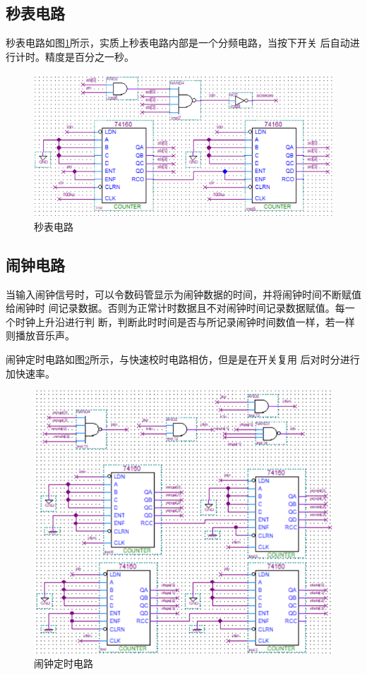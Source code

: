 \documentclass[twoside, openright]{article}
\begin{document}
\subsection{秒表电路}%
\label{sub:秒表电路}

秒表电路如图\ref{fig:秒表电路}所示，实质上秒表电路内部是一个分频电路，当按下开关
后自动进行计时。精度是百分之一秒。

\begin{figure}[htbp]
	\centering
	\includegraphics[width = 0.7\linewidth]{timer.png}
	\caption{秒表电路}
	\label{fig:秒表电路}
\end{figure}

\subsection{闹钟电路}%
\label{sub:闹钟电路}

当输入闹钟信号时，可以令数码管显示为闹钟数据的时间，并将闹钟时间不断赋值给闹钟时
间记录数据。否则为正常计时数据且不对闹钟时间记录数据赋值。每一个时钟上升沿进行判
断，判断此时时间是否与所记录闹钟时间数值一样，若一样则播放音乐声。

闹钟定时电路如图\ref{fig:闹钟定时电路}所示，与快速校时电路相仿，但是是在开关复用
后对时分进行加快速率。

\begin{figure}[htbp]
	\centering
	\includegraphics[width = 0.8\linewidth]{determine.png}
	\caption{闹钟定时电路}
	\label{fig:闹钟定时电路}
\end{figure}
\end{document}
